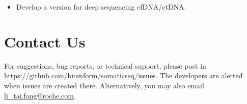 \documentclass[10pt,letterpaper]{article}
\begin{document}
\begin{sloppypar}
\begin{itemize}

  \item
  Develop a version for deep sequencing cfDNA/ctDNA.
    
\end{itemize}











\section{Contact Us}
For suggestions, bug reports, or technical support, please post in \href{https://github.com/bioinform/somaticseq/issues}{https://github.com/bioinform/somaticseq/issues}. The developers are alerted when issues are created there. Alternatively, you may also email \href{mailto:li_tai.fang@roche.com}{li\_tai.fang@roche.com}. 

\end{sloppypar}
\end{document}
